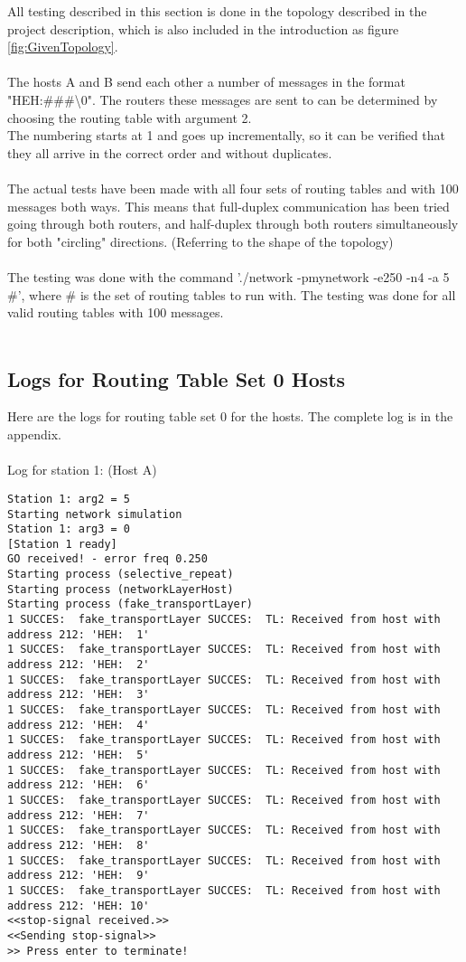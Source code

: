 All testing described in this section is done in the topology described in the project description, which is also included in the introduction as figure \ref{fig:GivenTopology}.
\\
\\
The hosts A and B send each other a number of messages in the format "HEH:\#\#\#\textbackslash0". The routers these messages are sent to can be determined by choosing the routing table with argument 2.\\
The numbering starts at 1 and goes up incrementally, so it can be verified that they all arrive in the correct order and without duplicates.\\
\\
The actual tests have been made with all four sets of routing tables and with 100 messages both ways. This means that full-duplex communication has been tried going through both routers, and half-duplex through both routers simultaneously for both "circling" directions. (Referring to the shape of the topology)\\
\\
The testing was done with the command './network -pmynetwork -e250 -n4 -a 5 \#', where \# is the set of routing tables to run with. The testing was done for all valid routing tables with 100 messages.\\
\\

\subsection{Logs for Routing Table Set 0 Hosts}
Here are the logs for routing table set 0 for the hosts. The complete log is in the appendix.\\
\\

Log for station 1: (Host A)
\begin{lstlisting}[breaklines=true]
Station 1: arg2 = 5
Starting network simulation
Station 1: arg3 = 0
[Station 1 ready]
GO received! - error freq 0.250
Starting process (selective_repeat)
Starting process (networkLayerHost)
Starting process (fake_transportLayer)
1 SUCCES:  fake_transportLayer SUCCES:  TL: Received from host with address 212: 'HEH:  1'
1 SUCCES:  fake_transportLayer SUCCES:  TL: Received from host with address 212: 'HEH:  2'
1 SUCCES:  fake_transportLayer SUCCES:  TL: Received from host with address 212: 'HEH:  3'
1 SUCCES:  fake_transportLayer SUCCES:  TL: Received from host with address 212: 'HEH:  4'
1 SUCCES:  fake_transportLayer SUCCES:  TL: Received from host with address 212: 'HEH:  5'
1 SUCCES:  fake_transportLayer SUCCES:  TL: Received from host with address 212: 'HEH:  6'
1 SUCCES:  fake_transportLayer SUCCES:  TL: Received from host with address 212: 'HEH:  7'
1 SUCCES:  fake_transportLayer SUCCES:  TL: Received from host with address 212: 'HEH:  8'
1 SUCCES:  fake_transportLayer SUCCES:  TL: Received from host with address 212: 'HEH:  9'
1 SUCCES:  fake_transportLayer SUCCES:  TL: Received from host with address 212: 'HEH: 10'
<<stop-signal received.>>
<<Sending stop-signal>>
>> Press enter to terminate!
\end{lstlisting}

